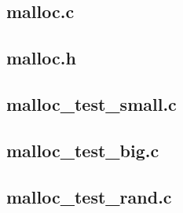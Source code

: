 \documentclass[paper=a4, fontsize=11pt]{scrartcl} %
\numberwithin{equation}{section} %
\numberwithin{figure}{section} %
\numberwithin{table}{section} %
\begin{document}
\subsection*{malloc.c}


\newpage
\subsection*{malloc.h}


\newpage
\subsection*{malloc\_test\_small.c}


\newpage
\subsection*{malloc\_test\_big.c}


\newpage
\subsection*{malloc\_test\_rand.c}

\end{document}
